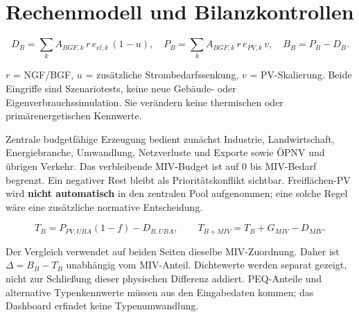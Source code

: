 \documentclass[
  ngerman,
  a4paper,
  DIV=11]{scrreprt}
\begin{document}
\section{Rechenmodell und
Bilanzkontrollen}\label{rechenmodell-und-bilanzkontrollen}

\[D_B=\sum_k A_{BGF,k}\,r\,e_{el,k}\,(1-u),\quad
P_B=\sum_k A_{BGF,k}\,r\,e_{PV,k}\,v,\quad B_B=P_B-D_B.\]

\(r\) = NGF/BGF, \(u\) = zusätzliche Strombedarfssenkung, \(v\) =
PV-Skalierung. Beide Eingriffe sind Szenariotests, keine neue Gebäude-
oder Eigenverbrauchssimulation. Sie verändern keine thermischen oder
primärenergetischen Kennwerte.

Zentrale budgetfähige Erzeugung bedient zunächst Industrie,
Landwirtschaft, Energiebranche, Umwandlung, Netzverluste und Exporte
sowie ÖPNV und übrigen Verkehr. Das verbleibende MIV-Budget ist auf 0
bis MIV-Bedarf begrenzt. Ein negativer Rest bleibt als
Prioritätskonflikt sichtbar. Freiflächen-PV wird \textbf{nicht
automatisch} in den zentralen Pool aufgenommen; eine solche Regel wäre
eine zusätzliche normative Entscheidung.

\[T_B=P_{PV,UBA}(1-f)-D_{B,UBA},\qquad
T_{B+MIV}=T_B+G_{MIV}-D_{MIV}.\]

Der Vergleich verwendet auf beiden Seiten dieselbe MIV-Zuordnung. Daher
ist \(\Delta=B_B-T_B\) unabhängig vom MIV-Anteil. Dichtewerte werden
separat gezeigt, nicht zur Schließung dieser physischen Differenz
addiert. PEQ-Anteile und alternative Typenkennwerte müssen aus den
Eingabedaten kommen; das Dashboard erfindet keine Typenumwandlung.
\end{document}
